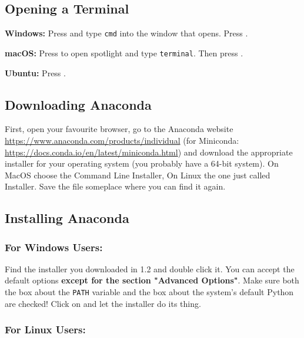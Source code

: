 \subsection{Opening a Terminal}

\vspace{1em}

\textbf{Windows:} Press  and type \texttt{cmd} into the window that opens. Press \keys{\return}.

\vspace{1em}

\noindent \textbf{macOS:} Press \keys{\cmdmac + \Space} to open spotlight and type \texttt{terminal}. Then press \keys{\return}.

\vspace{1em}

\noindent \textbf{Ubuntu:} Press .

\vspace{1em}

\subsection{Downloading Anaconda}

First, open your favourite browser, go to the Anaconda website \url{https://www.anaconda.com/products/individual} (for Miniconda: \url{https://docs.conda.io/en/latest/miniconda.html}) and download the appropriate installer for your operating system (you probably have a 64-bit system). On MacOS choose the Command Line Installer, On Linux the one just called Installer. Save the file someplace where you can find it again.

\subsection{Installing Anaconda}

\subsubsection*{For Windows Users:}

Find the installer you downloaded in 1.2 and double click it. You can accept the default options \textbf{except for the section "Advanced Options"}. Make sure both the box about the \texttt{PATH} variable and the box about the system's default Python are checked! Click on  and let the installer do its thing.

\subsubsection*{For Linux Users:}

